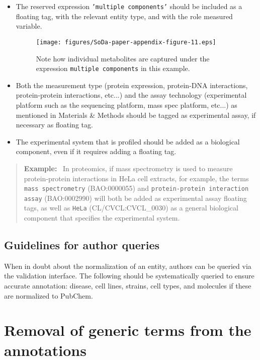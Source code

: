 \documentclass{bioinfo}
\newenvironment{example}
{\par\color{black}\begin{quote}\textbf{Example:}\ }
{\end{quote}\par}
\begin{document}
\begin{itemize}
    \item The reserved expression \texttt{'multiple components'} should be included as a floating tag, with the relevant entity type, and with the role measured variable.
    
\begin{figure*}
        \centering
        \texttt{[image: figures/SoDa-paper-appendix-figure-11.eps]}
        \caption{Note how individual metabolites are captured under the expression \texttt{multiple components} in this example.}
        \label{fig:multiple_components}
    \end{figure*}

    \item Both the measurement type (protein expression, protein-DNA interactions, protein-protein interactions, etc...) and the assay technology (experimental platform such as the sequencing platform, mass spec platform, etc...) as mentioned in Materials \& Methods should be tagged as experimental assay, if necessary as floating tag.
    \item The experimental system that is profiled should be added as a biological component, even if it requires adding a floating tag.
\end{itemize}

\begin{example}
    In proteomics, if mass spectrometry is used to measure protein-protein interactions in HeLa cell extracts, for example, the terms \texttt{mass spectrometry} (BAO:0000055) and \texttt{protein-protein interaction assay} (BAO:0002990) will both be added as experimental assay floating tags, as well as \texttt{HeLa} (CL/CVCL:CVCL\_0030) as a general biological component that specifies the experimental system.
\end{example}

\subsection{Guidelines for author queries}\label{app:guidelines-for-author-queries}
When in doubt about the normalization of an entity, authors can be queried via the validation interface. The following should be systematically queried to ensure accurate annotation: disease, cell lines, strains, cell types, and molecules if these are normalized to PubChem.

\section{Removal of generic terms from the annotations}\label{app:generic-terms}
\end{document}
